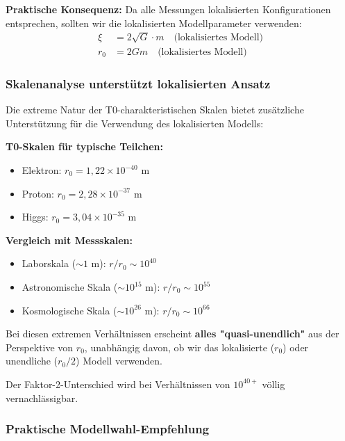 \documentclass[12pt,a4paper]{article}
\begin{document}
\textbf{Praktische Konsequenz:}
Da alle Messungen lokalisierten Konfigurationen entsprechen, sollten wir die lokalisierten Modellparameter verwenden:
\begin{align}
	\xi &= 2\sqrt{G} \cdot m \quad \text{(lokalisiertes Modell)} \\
	r_0 &= 2Gm \quad \text{(lokalisiertes Modell)}
\end{align}

\subsubsection{Skalenanalyse unterstützt lokalisierten Ansatz}
\label{subsubsec:scale_analysis_localized}

Die extreme Natur der T0-charakteristischen Skalen bietet zusätzliche Unterstützung für die Verwendung des lokalisierten Modells:

\textbf{T0-Skalen für typische Teilchen:}
\begin{itemize}
	\item Elektron: $r_0 = 1,22 \times 10^{-40}$ m
	\item Proton: $r_0 = 2,28 \times 10^{-37}$ m  
	\item Higgs: $r_0 = 3,04 \times 10^{-35}$ m
\end{itemize}

\textbf{Vergleich mit Messskalen:}
\begin{itemize}
	\item Laborskala ($\sim 1$ m): $r/r_0 \sim 10^{40}$
	\item Astronomische Skala ($\sim 10^{15}$ m): $r/r_0 \sim 10^{55}$
	\item Kosmologische Skala ($\sim 10^{26}$ m): $r/r_0 \sim 10^{66}$
\end{itemize}

\begin{tcolorbox}[colback=blue!5!white,colframe=blue!75!black,title=Skalenhierarchie-Einsicht]
	Bei diesen extremen Verhältnissen erscheint \textbf{alles "quasi-unendlich"} aus der Perspektive von $r_0$, unabhängig davon, ob wir das lokalisierte ($r_0$) oder unendliche ($r_0/2$) Modell verwenden.
	
	Der Faktor-2-Unterschied wird bei Verhältnissen von $10^{40+}$ völlig vernachlässigbar.
\end{tcolorbox}

\subsubsection{Praktische Modellwahl-Empfehlung}  
\label{subsubsec:model_choice_recommendation}
\end{document}
